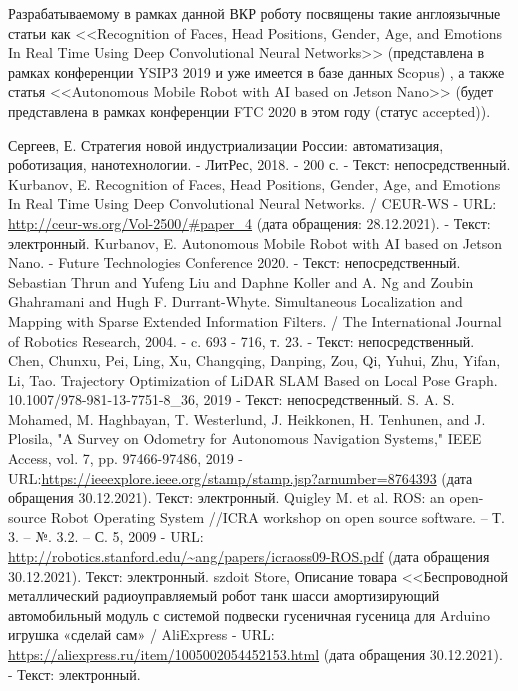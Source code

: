 \documentclass[12pt,a4paper]{scrartcl}
\begin{document}
			Разрабатываемому в рамках данной ВКР роботу посвящены такие англоязычные статьи как <<Recognition of Faces, Head Positions, Gender, Age, and Emotions In Real Time Using Deep Convolutional Neural Networks>> (представлена в рамках конференции YSIP3 2019 и уже имеется в базе данных Scopus) \cite{bib:YSIP-32019}, а также статья <<Autonomous Mobile Robot with AI based on Jetson Nano>> (будет представлена в рамках конференции FTC 2020 в этом году (статус accepted))\cite{bib:FTC2020}.
	
		\newpage

	\begin{thebibliography}{5}
		 Сергеев, Е. Стратегия новой индустриализации России: автоматизация, роботизация, нанотехнологии. - ЛитРес, 2018. - 200 с. - Текст: непосредственный.
		 Kurbanov, E. Recognition of Faces, Head Positions, Gender, Age, and Emotions In Real Time Using Deep Convolutional Neural Networks. / CEUR-WS - URL: \url{http://ceur-ws.org/Vol-2500/#paper_4} (дата обращения: 28.12.2021). - Текст: электронный.
		 Kurbanov, E. Autonomous Mobile Robot with AI based on Jetson Nano. - Future Technologies Conference 2020. - Текст: непосредственный.
		 Sebastian Thrun and Yufeng Liu and Daphne Koller and A. Ng and Zoubin Ghahramani and Hugh F. Durrant-Whyte. Simultaneous Localization and Mapping with Sparse Extended Information Filters. / The International Journal of Robotics Research, 2004. - c. 693 - 716, т. 23. - Текст: непосредственный.
		 Chen, Chunxu, Pei, Ling, Xu, Changqing, Danping, Zou, Qi, Yuhui, Zhu, Yifan, Li, Tao. Trajectory Optimization of LiDAR SLAM Based on Local Pose Graph. 10.1007/978-981-13-7751-8\_36, 2019 - Текст: непосредственный.
		 S. A. S. Mohamed, M. Haghbayan, T. Westerlund, J. Heikkonen, H. Tenhunen, and J. Plosila, "A Survey on Odometry for Autonomous Navigation Systems," IEEE Access, vol. 7, pp. 97466-97486, 2019 - URL:\url{https://ieeexplore.ieee.org/stamp/stamp.jsp?arnumber=8764393} (дата обращения 30.12.2021). Текст: электронный.
		 Quigley M. et al. ROS: an open-source Robot Operating System //ICRA workshop on open source software. – Т. 3. – №. 3.2. – С. 5, 2009 - URL: \url{http://robotics.stanford.edu/~ang/papers/icraoss09-ROS.pdf} (дата обращения 30.12.2021). Текст: электронный.
		 szdoit Store, Описание товара <<Беспроводной металлический радиоуправляемый робот танк шасси амортизирующий автомобильный модуль с системой подвески гусеничная гусеница для Arduino игрушка «сделай сам» / AliExpress - URL: \url{https://aliexpress.ru/item/1005002054452153.html} (дата обращения 30.12.2021). - Текст: электронный.

\end{thebibliography}
\end{document}
